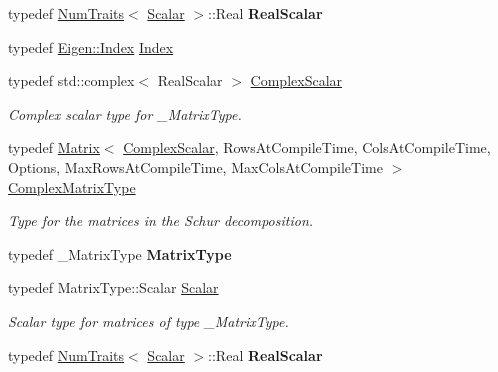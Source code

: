 \begin{DoxyCompactItemize}
typedef \hyperlink{group___core___module_struct_eigen_1_1_num_traits}{Num\+Traits}$<$ \hyperlink{group___eigenvalues___module_a9a8ee9df37ee1f90d0e53103c58683c0}{Scalar} $>$\+::Real {\bfseries Real\+Scalar}
\item 
typedef \hyperlink{namespace_eigen_a62e77e0933482dafde8fe197d9a2cfde}{Eigen\+::\+Index} \hyperlink{group___eigenvalues___module_a652104d13723a5b1db2937866a034557}{Index}
\item 
typedef std\+::complex$<$ Real\+Scalar $>$ \hyperlink{group___eigenvalues___module_ae1a4713b53f821867fbad617e426832a}{Complex\+Scalar}
\begin{DoxyCompactList}\small\item\em Complex scalar type for {\ttfamily \+\_\+\+Matrix\+Type}. \end{DoxyCompactList}\item 
typedef \hyperlink{group___core___module_class_eigen_1_1_matrix}{Matrix}$<$ \hyperlink{group___eigenvalues___module_ae1a4713b53f821867fbad617e426832a}{Complex\+Scalar}, Rows\+At\+Compile\+Time, Cols\+At\+Compile\+Time, Options, Max\+Rows\+At\+Compile\+Time, Max\+Cols\+At\+Compile\+Time $>$ \hyperlink{group___eigenvalues___module_af61fe57877d51cfb50178f78534042f0}{Complex\+Matrix\+Type}
\begin{DoxyCompactList}\small\item\em Type for the matrices in the Schur decomposition. \end{DoxyCompactList}\item 
\mbox{\label{group___eigenvalues___module_afb9e799fdea51d173e310c82d80d5947}} 
typedef \+\_\+\+Matrix\+Type {\bfseries Matrix\+Type}
\item 
\mbox{\label{group___eigenvalues___module_a9a8ee9df37ee1f90d0e53103c58683c0}} 
typedef Matrix\+Type\+::\+Scalar \hyperlink{group___eigenvalues___module_a9a8ee9df37ee1f90d0e53103c58683c0}{Scalar}
\begin{DoxyCompactList}\small\item\em Scalar type for matrices of type {\ttfamily \+\_\+\+Matrix\+Type}. \end{DoxyCompactList}\item 
\mbox{\label{group___eigenvalues___module_a360081b7ad59db28b9955dea3e4b7dd7}} 
typedef \hyperlink{group___core___module_struct_eigen_1_1_num_traits}{Num\+Traits}$<$ \hyperlink{group___eigenvalues___module_a9a8ee9df37ee1f90d0e53103c58683c0}{Scalar} $>$\+::Real {\bfseries Real\+Scalar}

\end{DoxyCompactItemize}
